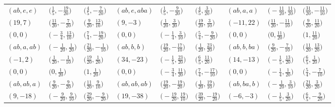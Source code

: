 \documentclass[pdftex]{sigma}
\theoremstyle{definition}
\numberwithin{equation}{section}
\begin{document}
\begin{landscape}
\begin{table}[th]\centering\small
\begin{tabular}{|lll|lll|lll|}
 \hline
$(ab, e, e)$ & $\bigl(\frac{1}{5}, -\frac{19}{20}\bigr)$ & $\bigl(\frac{4}{5}, -\frac{7}{20}\bigr)$ & $(ab, e, aba)$ & $\bigl(\frac{1}{5}, -\frac{9}{20}\bigr)$ & $\bigl(\frac{4}{5}, \frac{3}{20}\bigr)$ & $(ab, a, a)$ & $\bigl(-\frac{11}{20}, \frac{11}{20}\bigr)$ & $\bigl(\frac{31}{20}, -\frac{11}{10}\bigr)$ \\
$(19, 7)$ & $\bigl(\frac{11}{20}, -\frac{7}{20}\bigr)$ & $\bigl(\frac{9}{20}, \frac{13}{10}\bigr)$ & $(9, -3)$ & $\bigl(\frac{1}{20}, \frac{3}{20}\bigr)$ & $\bigl(\frac{19}{20}, \frac{3}{10}\bigr)$ & $(-11, 22)$ & $\bigl(\frac{11}{20}, -\frac{11}{10}\bigr)$ & $\bigl(\frac{9}{20}, \frac{11}{20}\bigr)$
\\
$(0, 0)$ & $\bigl(-\frac{3}{4}, \frac{13}{10}\bigr)$ & $\bigl(\frac{7}{4}, -\frac{19}{20}\bigr)$ & $(0, 0)$ & $\bigl(-\frac{1}{4}, \frac{3}{10}\bigr)$ & $\bigl(\frac{5}{4}, -\frac{9}{20}\bigr)$ & $(0, 0)$ & $\bigl(0, \frac{11}{20}\bigr)$ & $\bigl(1, \frac{11}{20}\bigr)$
\\\hline
$(ab, a, ab)$ & $\bigl(-\frac{1}{20}, \frac{1}{20}\bigr)$ & $\bigl(\frac{21}{20}, -\frac{1}{10}\bigr)$ & $(ab, b, b)$ & $\bigl(\frac{19}{20}, -\frac{17}{10}\bigr)$ & $\bigl(\frac{1}{20}, \frac{23}{20}\bigr)$ & $(ab, b, ba)$ & $\bigl(\frac{9}{20}, -\frac{7}{10}\bigr)$ & $\bigl(\frac{11}{20}, \frac{13}{20}\bigr)$
\\
$(-1, 2)$ & $\bigl(\frac{1}{20}, -\frac{1}{10}\bigr)$ & $\bigl(\frac{19}{20}, \frac{1}{20}\bigr)$ & $(34, -23)$ & $\bigl(-\frac{1}{5}, \frac{23}{20}\bigr)$ & $\bigl(\frac{6}{5}, \frac{11}{20}\bigr)$ & $(14, -13)$ & $\bigl(-\frac{1}{5}, \frac{13}{20}\bigr)$ & $\bigl(\frac{6}{5}, \frac{1}{20}\bigr)$
\\
$(0, 0)$ & $\bigl(0, \frac{1}{20}\bigr)$ & $\bigl(1, \frac{1}{20}\bigr)$ & $(0, 0)$ & $\bigl(-\frac{3}{4}, \frac{11}{20}\bigr)$ & $\bigl(\frac{7}{4}, -\frac{17}{10}\bigr)$ & $(0, 0)$ & $\bigl(-\frac{1}{4}, \frac{1}{20}\bigr)$ & $\bigl(\frac{5}{4}, -\frac{7}{10}\bigr)$
\\\hline
$(ab, ab, a)$ & $\bigl(\frac{9}{20}, -\frac{9}{20}\bigr)$ & $\bigl(\frac{11}{20}, \frac{9}{10}\bigr)$ & $(ab, ab, ab)$ & $\bigl(\frac{19}{20}, -\frac{19}{20}\bigr)$ & $\bigl(\frac{1}{20}, \frac{19}{10}\bigr)$ & $(ab, ba, b)$ & $\bigl(-\frac{1}{20}, \frac{3}{10}\bigr)$ & $\bigl(\frac{21}{20}, \frac{3}{20}\bigr)$
\\
$(9, -18)$ & $\bigl(-\frac{9}{20}, \frac{9}{10}\bigr)$ & $\bigl(\frac{29}{20}, -\frac{9}{20}\bigr)$ & $(19, -38)$ & $\bigl(-\frac{19}{20}, \frac{19}{10}\bigr)$ & $\bigl(\frac{39}{20}, -\frac{19}{20}\bigr)$ & $(-6, -3)$ & $\bigl(-\frac{1}{5}, \frac{3}{20}\bigr)$ & $\bigl(\frac{6}{5}, -\frac{9}{20}\bigr)$

\end{tabular}
\end{table}
\end{landscape}
\end{document}
